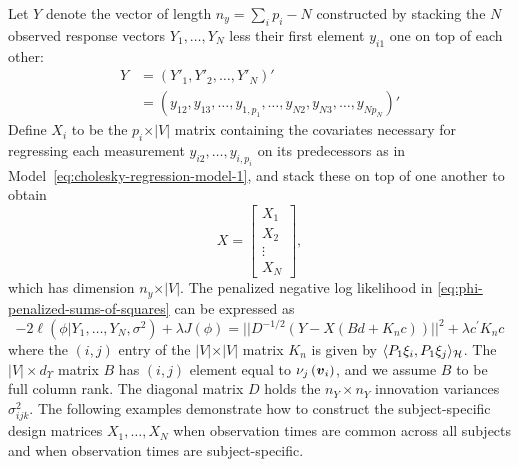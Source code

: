 Let $Y$ denote the vector of length $n_y= \sum_{i} p_i - N$  constructed by stacking the $N$ observed response vectors $Y_1,\dots, Y_N$ less their first element $y_{i1}$ one on top of each other:
\begin{align*}
Y &= \left( Y'_1, Y'_2, \dots, Y'_{N} \right)'\\
 &= \left( y_{12}, y_{13},\dots, y_{1,p_1}, \dots, y_{N2}, y_{N3},\dots, y_{Np_N} \right)'
\end{align*}
\noindent
Define $X_i$ to be the $p_i \times \vert V \vert$ matrix containing the covariates necessary for regressing each measurement $y_{i2}, \dots, y_{i,p_i}$ on its predecessors as in Model~\eqref{eq:cholesky-regression-model-1}, and stack these on top of one another to obtain
\begin{equation} \label{eq:ar-design-matrix-1}
X = \begin{bmatrix}
X_1 \\
X_2\\
\vdots \\
X_N
\end{bmatrix},
\end{equation}
\noindent
which has dimension $n_y \times \vert V \vert$. The penalized negative log likelihood in \eqref{eq:phi-penalized-sums-of-squares} can be expressed as
\begin{equation} \label{eq:penalized-likelihood-vectorized}
-2\ell\left(\phi \vert Y_1,\dots, Y_N, \sigma^2\right) + \lambda J\left(\phi\right) = \vert \vert D^{-1/2}\left( Y - X \left( Bd + K_nc \right) \right) \vert \vert^2  + \lambda c^\prime K_n c 
\end{equation}
\noindent
where the $\left(i,j\right)$ entry of the $\vert V \vert \times \vert V \vert$ matrix $K_n$ is given by $\langle P_1 \xi_i,  P_1 \xi_j \rangle_{\mathcal{H}}$. The $\vert V \vert \times d_\Upsilon$ matrix $B$ has $\left(i,j\right)$ element equal to $\nu_j\left(\mbox{\boldmath $v$}_i\right)$, and we assume $B$ to be full column rank.  The diagonal matrix $D$ holds the $n_Y \times n_Y$  innovation variances $\sigma^2_{ijk}$. The following examples demonstrate how to construct the subject-specific design matrices $X_1,\dots, X_N$ when observation times are common across all subjects and when observation times are subject-specific.

